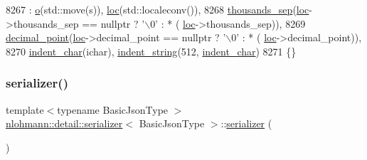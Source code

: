 \begin{DoxyCode}
8267         : \hyperlink{classnlohmann_1_1detail_1_1serializer_acf3c88660d3cbc65fc71c4d84f2a9f59}{o}(std::move(s)), \hyperlink{classnlohmann_1_1detail_1_1serializer_a1952945b7652afb59d3903cc8457a589}{loc}(std::localeconv()),
8268           \hyperlink{classnlohmann_1_1detail_1_1serializer_a78a6ae833bb6cf7f00cb0d51db114b14}{thousands\_sep}(\hyperlink{classnlohmann_1_1detail_1_1serializer_a1952945b7652afb59d3903cc8457a589}{loc}->thousands\_sep == \textcolor{keyword}{nullptr} ? \textcolor{charliteral}{'\(\backslash\)0'} : * (
      \hyperlink{classnlohmann_1_1detail_1_1serializer_a1952945b7652afb59d3903cc8457a589}{loc}->thousands\_sep)),
8269           \hyperlink{classnlohmann_1_1detail_1_1serializer_a311e5d6f4b31d5be0eb3c0cb20b6965a}{decimal\_point}(\hyperlink{classnlohmann_1_1detail_1_1serializer_a1952945b7652afb59d3903cc8457a589}{loc}->decimal\_point == \textcolor{keyword}{nullptr} ? \textcolor{charliteral}{'\(\backslash\)0'} : * (
      \hyperlink{classnlohmann_1_1detail_1_1serializer_a1952945b7652afb59d3903cc8457a589}{loc}->decimal\_point)),
8270           \hyperlink{classnlohmann_1_1detail_1_1serializer_a9a55e6b028d09676fe35aefa0c72ea5b}{indent\_char}(ichar), \hyperlink{classnlohmann_1_1detail_1_1serializer_ae9268a10d88a5526e32735a55a132fc6}{indent\_string}(512, 
      \hyperlink{classnlohmann_1_1detail_1_1serializer_a9a55e6b028d09676fe35aefa0c72ea5b}{indent\_char})
8271     \{\}
\end{DoxyCode}
\mbox{\label{classnlohmann_1_1detail_1_1serializer_ae3771351ec4cb892bec707edeb56dc31}} 
\subsubsection{\texorpdfstring{serializer()}{serializer()}\hspace{0.1cm}{\footnotesize\ttfamily [2/2]}}
{\footnotesize\ttfamily template$<$typename Basic\+Json\+Type $>$ \\
\hyperlink{classnlohmann_1_1detail_1_1serializer}{nlohmann\+::detail\+::serializer}$<$ Basic\+Json\+Type $>$\+::\hyperlink{classnlohmann_1_1detail_1_1serializer}{serializer} (\begin{DoxyParamCaption}\item[{const \hyperlink{classnlohmann_1_1detail_1_1serializer}{serializer}$<$ Basic\+Json\+Type $>$ \&}]{ }\end{DoxyParamCaption})\hspace{0.3cm}{\ttfamily [delete]}}



